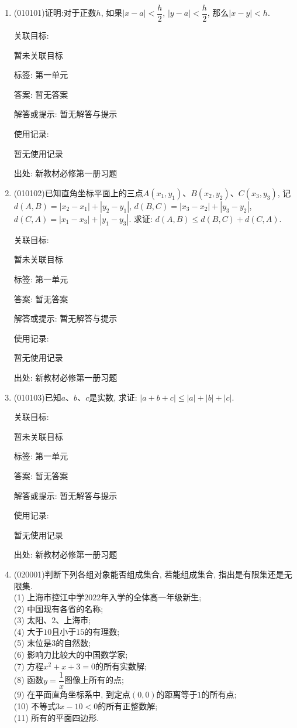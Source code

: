 \documentclass[10pt,a4paper]{article}
\begin{document}
\begin{enumerate}[1.]

\item { (010101)}证明:对于正数$h$, 如果$|x-a| <\dfrac h2$, $|y-a| <\dfrac h2$, 那么$|x-y| <h$.


关联目标:

暂未关联目标



标签: 第一单元

答案: 暂无答案

解答或提示: 暂无解答与提示

使用记录:

暂无使用记录


出处: 新教材必修第一册习题
\item { (010102)}已知直角坐标平面上的三点$A(x_1, y_1)$、$B(x_2, y_2)$、$C(x_3, y_3)$, 记$d(A, B)=|x_2-x_1| +|y_2-y_1|$, $d(B, C)=|x_3-x_2| +|y_3-y_2|$, $d(C, A)=|x_1-x_3| +|y_1-y_3|$. 求证: $d(A, B)\le d(B, C)+d(C, A)$.


关联目标:

暂未关联目标



标签: 第一单元

答案: 暂无答案

解答或提示: 暂无解答与提示

使用记录:

暂无使用记录


出处: 新教材必修第一册习题
\item { (010103)}已知$a$、$b$、$c$是实数, 求证: $|a+b+c| \le |a|+|b|+|c|$.


关联目标:

暂未关联目标



标签: 第一单元

答案: 暂无答案

解答或提示: 暂无解答与提示

使用记录:

暂无使用记录


出处: 新教材必修第一册习题
\item { (020001)}判断下列各组对象能否组成集合, 若能组成集合, 指出是有限集还是无限集.\\
(1) 上海市控江中学$2022$年入学的全体高一年级新生;\\
(2) 中国现有各省的名称;\\
(3) 太阳、$2$、上海市;\\
(4) 大于$10$且小于$15$的有理数;\\
(5) 末位是$3$的自然数;\\
(6) 影响力比较大的中国数学家;\\
(7) 方程$x^2+x+3=0$的所有实数解;\\ 
(8) 函数$y=\dfrac 1x$图像上所有的点;\\ 
(9) 在平面直角坐标系中, 到定点$(0, 0)$的距离等于$1$的所有点;\\
(10) 不等式$3x-10<0$的所有正整数解;\\
(11) 所有的平面四边形.



\end{enumerate}
\end{document}
